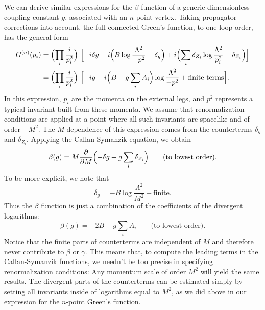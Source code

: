 We can derive similar expressions for the $\beta$ function of a generic
dimensionless coupling constant $g$, associated with an $n$-point vertex.
Taking propagator corrections into account, the full connected Green's
function, to one-loop order, has the general form
\begin{equation}
  \begin{aligned}
    G^{(n)}(p_i) &= \Bigl( \prod_i \frac{i}{p_i^2} \Bigr)\ \Bigl[
      -i\delta g - i\Bigl( B\log\frac{\Lambda^2}{-p^2} - \delta_g \Bigr)
      + i\Bigl( \sum_i \delta_{Z_i}\log\frac{\Lambda^2}{p_i^2}
        - \delta_{Z_i} \Bigr) \Bigr]\\
    &= \Bigl( \prod_i \frac{i}{p_i^2} \Bigr)\ \Bigl[ -ig - i\Bigl(
      B - g\sum_i A_i \Bigr)\log\frac{\Lambda^2}{-p^2} + \text{finite terms}
      \Bigr] .
  \end{aligned}
  \label{eq:12.52}
\end{equation}
In this expression, $p_i$ are the momenta on the external legs, and $p^2$
represents a typical invariant built from these momenta.  We assume that
renormalization conditions are applied at a point where all such invariants
are spacelike and of order $-M^2$.  The $M$ dependence of this expression
comes from the counterterms $\delta_g$ and $\delta_{Z_i}$.  Applying the
Callan-Symanzik equation, we obtain
\begin{equation}
  \beta(g) = M\frac{\partial}{\partial M}\Bigl( -\delta g
    + g\sum_i \delta_{Z_i} \Bigr) \qquad \text{(to lowest order)} .
  \label{eq:12.53}
\end{equation}
To be more explicit, we note that
\begin{equation}
  \delta_g = -B\log\frac{\Lambda^2}{M^2} + \text{finite} .
\end{equation}
Thus the $\beta$ function is just a combination of the coefficients of the
divergent logarithms:
\begin{equation}
  \beta(g) = -2B - g\sum_i A_i \qquad \text{(to lowest order)} .
  \label{eq:12.54}
\end{equation}
Notice that the finite parts of counterterms are independent of $M$ and
therefore never contribute to $\beta$ or $\gamma$.  This means that, to
compute the leading terms in the Callan-Symanzik functions, we needn't be
too precise in specifying renormalization conditions: Any momentum scale of
order $M^2$ will yield the same results.  The divergent parts of the
counterterms can be estimated simply by setting all invariants inside of
logarithms equal to $M^2$, as we did above in our expression for the $n$-point
Green's function.

